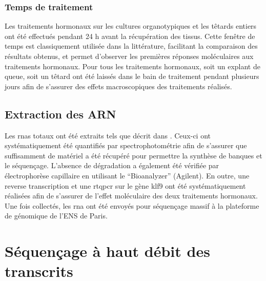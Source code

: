 \documentclass[../main.tex]{subfiles}
\begin{document}
\subsubsection{Temps de traitement}
Les traitements hormonaux sur les cultures organotypiques et les têtards entiers ont été effectués pendant 24 h avant la récupération des tissus.
Cette fenêtre de temps est classiquement utilisée dans la littérature, facilitant la comparaison des résultats obtenus, et permet d'observer les premières réponses moléculaires aux traitements hormonaux.
Pour tous les traitements hormonaux, soit un explant de queue, soit un têtard ont été laissés dans le bain de traitement pendant plusieurs jours afin de s'assurer des effets macroscopiques des traitements réalisés.


\subsection{Extraction des ARN}

Les \glspl{rna} totaux ont été extraits tels que décrit dans \citet{Bilesimo2011}.
Ceux-ci ont systématiquement été quantifiés par spectrophotométrie afin de s'assurer que suffisamment de matériel a été récupéré pour permettre la synthèse de banques et le séquençage.
L'absence de dégradation a également été vérifiée par électrophorèse capillaire en utilisant le ``Bioanalyzer'' (Agilent).
En outre, une reverse transcription et une \gls{rtqpcr} sur le gène \gls{klf9} ont été systématiquement réalisées afin de s'assurer de l'effet moléculaire des deux traitements hormonaux.
Une fois collectés, les \gls{rna} ont été envoyés pour séquençage massif à la plateforme de génomique de l'ENS de Paris.




\section{Séquençage à haut débit des transcrits}
\end{document}

